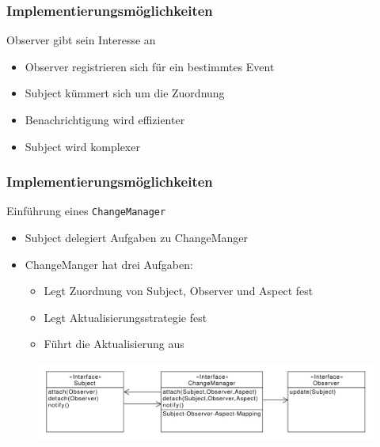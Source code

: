 \begin{frame}
\frametitle{Implementierungsmöglichkeiten}
		\begin{block}{Observer gibt sein Interesse an}
  		 \begin{itemize}
		  	\item Observer registrieren sich für ein bestimmtes Event
		  	\item Subject kümmert sich um die Zuordnung
		  	\item Benachrichtigung wird effizienter
		  	\item Subject wird komplexer
		  \end{itemize}  
  		\end{block}		
\end{frame}

\begin{frame}
\frametitle{Implementierungsmöglichkeiten}
		\begin{block}{Einführung eines \texttt{ChangeManager}}
  		 \begin{itemize}
		  	\item Subject delegiert Aufgaben zu ChangeManger
		  	\item ChangeManger hat drei Aufgaben:
		  	\begin{itemize}
		  		\item Legt Zuordnung von Subject, Observer und Aspect fest
		  		\item Legt Aktualisierungsstrategie fest
		  		\item Führt die Aktualisierung aus
		  	\end{itemize}
		  \end{itemize}  
  		\end{block}		
  		\begin{figure}
		\includegraphics[scale=.4]{paper/observer/changemanager}
	\end{figure}
\end{frame}

